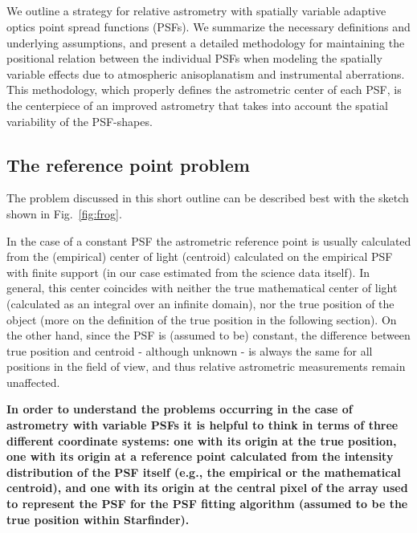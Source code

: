 \usepackage[english]{babel}
\usepackage[utf8]{inputenc}
\usepackage{amsmath}
\usepackage{graphicx}
\usepackage[colorinlistoftodos]{todonotes}

\subsection*{}
We outline a strategy for relative astrometry with spatially variable adaptive optics point spread functions (PSFs). We summarize the necessary definitions and underlying assumptions, and present a detailed methodology for maintaining the positional relation between the individual PSFs when modeling the spatially variable effects due to atmospheric anisoplanatism and instrumental aberrations. This methodology, which properly defines the astrometric center of each PSF, is the centerpiece of an improved astrometry that takes into account the spatial variability of the PSF-shapes.

\subsection{The reference point problem}

The problem discussed in this short outline can be described best with the sketch shown in Fig.~\ref{fig:frog}. 

In the case of a constant PSF the astrometric reference point is usually calculated from the (empirical) center of light (centroid) calculated on the empirical PSF with finite support (in our case estimated from the science data itself). In general, this center coincides with neither the true mathematical center of light (calculated as an integral over an infinite domain), nor the true position of the object (more on the definition of the true position in the following section). On the other hand, since the PSF is (assumed to be) constant, the difference between true position and centroid - although unknown - is always the same for all positions in the field of view, and thus relative astrometric measurements remain unaffected.

{\bf In order to understand the problems occurring in the case of astrometry with variable PSFs it is helpful to think in terms of three different coordinate systems: one with its origin at the true position, one with its origin at a reference point calculated from the intensity distribution of the PSF itself (e.g., the empirical or the mathematical centroid), and one with its origin at the central pixel of the array used to represent the PSF for the PSF fitting algorithm (assumed to be the true position within Starfinder).}

